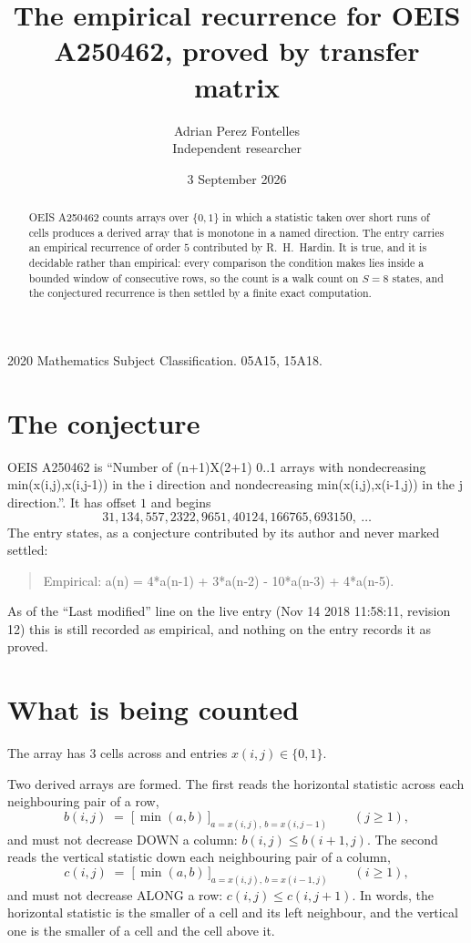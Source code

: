 \documentclass[11pt,a4paper]{article}
\title{The empirical recurrence for OEIS A250462, proved by transfer matrix}
\author{Adrian Perez Fontelles\\ \small Independent researcher}
\date{3 September 2026}
\theoremstyle{plain}
\theoremstyle{definition}
\begin{document}
\maketitle

\begin{abstract}
OEIS A250462 counts arrays over $\{0,1\}$ in which a statistic taken over short runs
of cells produces a derived array that is monotone in a named direction. The entry carries an
empirical recurrence of order $5$ contributed by R.~H.~Hardin. It is true, and it is
decidable rather than empirical: every comparison the condition makes lies inside a bounded
window of consecutive rows, so the count is a walk count on $S=8$ states, and the
conjectured recurrence is then settled by a finite exact computation.
\end{abstract}

\noindent\small 2020 Mathematics Subject Classification. 05A15, 15A18.\normalsize

\section{The conjecture}

OEIS A250462 is ``Number of (n+1)X(2+1) 0..1 arrays with nondecreasing min(x(i,j),x(i,j-1)) in the i direction and nondecreasing min(x(i,j),x(i-1,j)) in the j direction.''. It has offset $1$ and begins
\[
31, 134, 557, 2322, 9651, 40124, 166765, 693150,\ \dots
\]
The entry states, as a conjecture contributed by its author and never marked settled:
\begin{quote}
Empirical: a(n) = 4*a(n-1) + 3*a(n-2) - 10*a(n-3) + 4*a(n-5).
\end{quote}
As of the ``Last modified'' line on the live entry (Nov 14 2018 11:58:11, revision 12) this is still
recorded as empirical, and nothing on the entry records it as proved.

\section{What is being counted}

The array has $3$ cells across and entries $x(i,j)\in\{0,1\}$.

Two derived arrays are formed. The first reads the horizontal statistic across each
neighbouring pair of a row,
\[
b(i,j)\;=\;\bigl[\,\min(a,b)\,\bigr]_{a=x(i,j),\,b=x(i,j-1)}\qquad (j\ge1),
\]
and must not decrease DOWN a column: $b(i,j)\le b(i{+}1,j)$. The second reads the vertical
statistic down each neighbouring pair of a column,
\[
c(i,j)\;=\;\bigl[\,\min(a,b)\,\bigr]_{a=x(i,j),\,b=x(i{-}1,j)}\qquad (i\ge1),
\]
and must not decrease ALONG a row: $c(i,j)\le c(i,j{+}1)$. In words, the horizontal statistic
is the smaller of a cell and its left neighbour, and the vertical one is
the smaller of a cell and the cell above it.
\end{document}
